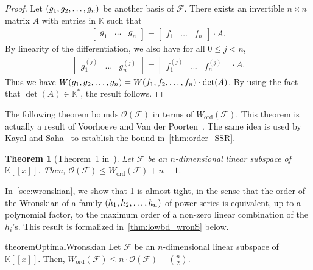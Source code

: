 \documentclass[a4paper, 11pt,dvipsnames]{article}
\newtheorem{theorem}{Theorem}
\newcommand{\OF}{\mathcal{O}}
\newcommand{\ord}{\operatorname{ord}}
\newcommand{\BK}{\mathbb{K}}
\begin{document}
\begin{proof} Let $(g_{1},g_{2},\dots,g_{n})$ be another basis of $\mathcal{F}$. There exists an invertible $n \times n$ matrix $A$ with entries in $\BK$ such that
        \begin{align*} \begin{bmatrix} g_1 & \dots & g_n \end{bmatrix} = \begin{bmatrix} f_1 & \dots & f_n \end{bmatrix} \cdot A.  \end{align*} By linearity of
        the differentiation, we also have for all $0 \le j < n$, \begin{align*} \begin{bmatrix} g_1^{(j)} & \dots & g_n^{(j)} \end{bmatrix} = \begin{bmatrix}
      f_1^{(j)} & \dots & f_n^{(j)} \end{bmatrix} \cdot A.  \end{align*} Thus we have $W(g_{1},g_{2},\dots,g_{n}) = W(f_{1},f_{2},\dots,f_{n}) \cdot \det(A)$. By using the fact that $\det
    (A) \in \BK^*$, the result follows.  \end{proof}
The following theorem  bounds $\OF(\mathcal{F})$ in terms of $W_{\ord}(\mathcal{F})$. This theorem is actually a result of Voorhoeve and Van der Poorten~\cite{voorhoeve1975wronskian}. The same idea is used by Kayal and Saha~\cite{kayal2012sum} to establish the bound in~\cref{thm:order_SSR}.
\begin{theorem}[Theorem~1  in~\cite{voorhoeve1975wronskian}]\label{thm:upbd_wronS} 
Let $\mathcal{F}$ be an $n$-dimensional linear subspace of $\BK[[x]]$. Then, $\OF(\mathcal{F})   \le W_{\ord}(\mathcal{F}) + n-1$.
\end{theorem}
  In~\cref{sec:wronskian}, we show that \cref{thm:upbd_wronS}  is almost tight, in the sense that the order of the Wronskian of a family $(h_{1},h_{2},\dots,h_{n})$ of power series is equivalent, up to a polynomial factor, to the maximum order of a non-zero linear combination of the $h_i$'s. This result is formalized in~\cref{thm:lowbd_wronS} below.

  \begin{restatable}{theorem}{OptimalWronskian}\label{thm:lowbd_wronS}
  Let $\mathcal{F}$ be an $n$-dimensional linear subspace of $\BK[[x]]$. Then, $W_{\ord}(\mathcal{F}) \le n \cdot \OF(\mathcal{F} ) - \binom{n}{2}$. 
\end{restatable}
\end{document}
